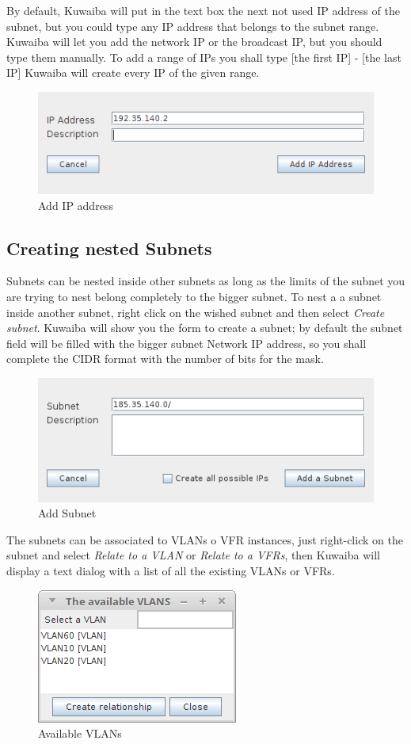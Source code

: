 \documentclass[a4paper]{article}
\begin{document}
		By default, Kuwaiba will put in the text box the next not used IP address of the subnet, but you could type any IP address that belongs to the subnet range. Kuwaiba will let you add the network IP or the broadcast IP, but you should type them manually. To add a range of IPs you shall type [the first IP] - [the last IP] Kuwaiba will create every IP of the given range. 
		\begin{figure}[h!]
			\centering
			\includegraphics[width=0.5\linewidth]{img/ipam_add_ip_address.png}
			\caption{Add IP address}
			\label{fig:ipam_add_ip_address}
		\end{figure}
	
	   	\subsection{Creating nested Subnets}
	   	
		Subnets can be nested inside other subnets as long as the limits of the subnet you are trying to nest belong completely to the bigger subnet. To nest a a subnet inside another subnet, right click on the wished subnet and then select \textit{Create subnet}. Kuwaiba will show you the form to create a subnet; by default the subnet field will be filled with the bigger subnet Network IP address, so you shall complete the CIDR format with the number of bits for the mask.
		\begin{figure}[h!]
			\centering
			\includegraphics[width=0.5\linewidth]{img/ipam_add_subsubnet.png}
			\caption{Add Subnet}
			\label{fig:ipam_add_subsubnet}
		\end{figure}
		
		
		The subnets can be associated to VLANs o VFR instances, just right-click on the subnet and select \textit{Relate to a VLAN} or \textit{Relate to a VFRs}, then Kuwaiba will display a text dialog with a list of all the existing VLANs or VFRs.
		\begin{figure}[h!]
			\centering
			\includegraphics[width=0.3\linewidth]{img/ipam_available_vlans.png}
			\caption{Available VLANs}
			\label{fig:ipam_available_vlans}
		\end{figure}
		
\end{document}
